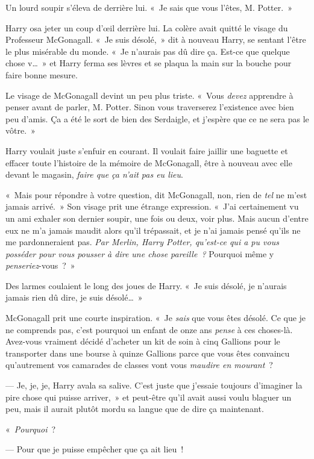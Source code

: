 Un lourd soupir s'éleva de derrière lui. «~Je sais que vous l'êtes, M. Potter.~»

Harry osa jeter un coup d'œil derrière lui. La colère avait quitté le visage du Professeur McGonagall. «~Je suis désolé,~» dit à nouveau Harry, se sentant l'être le plus misérable du monde. «~Je n'aurais pas dû dire ça. Est-ce que quelque chose v…~» et Harry ferma ses lèvres et se plaqua la main sur la bouche pour faire bonne mesure.

Le visage de McGonagall devint un peu plus triste. «~Vous \emph{devez} apprendre à penser avant de parler, M. Potter. Sinon vous traverserez l'existence avec bien peu d'amis. Ça a été le sort de bien des Serdaigle, et j'espère que ce ne sera pas le vôtre.~»

Harry voulait juste s'enfuir en courant. Il voulait faire jaillir une baguette et effacer toute l'histoire de la mémoire de McGonagall, être à nouveau avec elle devant le magasin, \emph{faire que ça n'ait pas eu lieu}.

«~Mais pour répondre à votre question, dit McGonagall, non, rien de \emph{tel} ne m'est jamais arrivé.~» Son visage prit une étrange expression. «~J'ai certainement vu un ami exhaler son dernier soupir, une fois ou deux, voir plus. Mais aucun d'entre eux ne m'a jamais maudit alors qu'il trépassait, et je n'ai jamais pensé qu'ils ne me pardonneraient pas. \emph{Par Merlin, Harry Potter, qu'est-ce qui a pu vous posséder pour vous pousser à dire une chose pareille~?} Pourquoi même y \emph{penseriez}-vous~?~»

Des larmes coulaient le long des joues de Harry. «~Je suis désolé, je n'aurais jamais rien dû dire, je suis désolé…~»

McGonagall prit une courte inspiration. «~Je \emph{sais} que vous êtes désolé. Ce que je ne comprends pas, c'est pourquoi un enfant de onze ans \emph{pense} à ces choses-là. Avez-vous vraiment décidé d'acheter un kit de soin à cinq Gallions pour le transporter dans une bourse à quinze Gallions parce que vous êtes convaincu qu'autrement vos camarades de classes vont vous \emph{maudire en mourant}~?

--- Je, je,  je, Harry avala sa salive. C'est juste que j'essaie toujours d'imaginer la pire chose qui puisse arriver,~» et peut-être qu'il avait aussi voulu blaguer un peu, mais il aurait plutôt mordu sa langue que de dire ça maintenant.

«~\emph{Pourquoi}~?

--- Pour que je puisse empêcher que ça ait lieu~!

